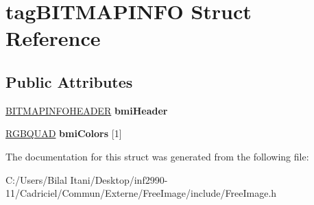 \hypertarget{structtag_b_i_t_m_a_p_i_n_f_o}{}\section{tag\+B\+I\+T\+M\+A\+P\+I\+N\+FO Struct Reference}
\label{structtag_b_i_t_m_a_p_i_n_f_o}
\subsection*{Public Attributes}
\begin{DoxyCompactItemize}
\item 
\hyperlink{structtag_b_i_t_m_a_p_i_n_f_o_h_e_a_d_e_r}{B\+I\+T\+M\+A\+P\+I\+N\+F\+O\+H\+E\+A\+D\+ER} {\bfseries bmi\+Header}\hypertarget{structtag_b_i_t_m_a_p_i_n_f_o_a1cbcd562dccbedec498b504f247405c3}{}\label{structtag_b_i_t_m_a_p_i_n_f_o_a1cbcd562dccbedec498b504f247405c3}

\item 
\hyperlink{structtag_r_g_b_q_u_a_d}{R\+G\+B\+Q\+U\+AD} {\bfseries bmi\+Colors} \mbox{[}1\mbox{]}\hypertarget{structtag_b_i_t_m_a_p_i_n_f_o_a5a9747ecf91e36b60469f6483ec1980e}{}\label{structtag_b_i_t_m_a_p_i_n_f_o_a5a9747ecf91e36b60469f6483ec1980e}

\end{DoxyCompactItemize}


The documentation for this struct was generated from the following file\+:\begin{DoxyCompactItemize}
\item 
C\+:/\+Users/\+Bilal Itani/\+Desktop/inf2990-\/11/\+Cadriciel/\+Commun/\+Externe/\+Free\+Image/include/Free\+Image.\+h\end{DoxyCompactItemize}
